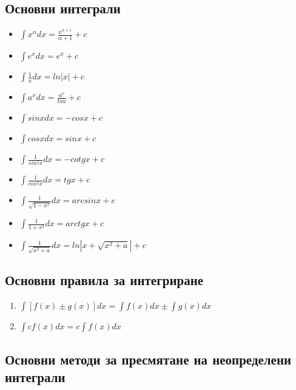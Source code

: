 \documentclass{article}
\begin{document}
\subsection*{{Основни интеграли}}

\begin{itemize}
    \item $\int x^{\alpha}dx = \frac{x^{\alpha+1}}{\alpha+1} + c$
    \item $\int e^xdx = e^x + c$
    \item $\int \frac{1}{x}dx = ln|x| + c$
    \item $\int a^xdx = \frac{a^x}{lna} + c$
    \item $\int sinxdx = -cosx + c$
    \item $\int cosxdx = sinx + c$
    \item $\int \frac{1}{sin^2x}dx = -cotgx + c$
    \item $\int \frac{1}{cos^2x}dx = tgx + c$
    \item $\int \frac{1}{\sqrt{1 - x^2}}dx = arcsinx + c$
    \item $\int \frac{1}{1 + x^2}dx = arctgx + c$
    \item $\int \frac{1}{\sqrt{x^2 + a}}dx = ln|x + \sqrt{x^2 + a}| + c$
\end{itemize}

\subsection*{{Основни правила за интегриране}}

\begin{enumerate}
    \item $\int [f(x) \pm g(x)]dx = \int f(x)dx \pm \int g(x)dx$
    \item $\int cf(x)dx = c\int f(x)dx$
\end{enumerate}

\subsection*{{Основни методи за пресмятане на неопределени интеграли}}
\end{document}
